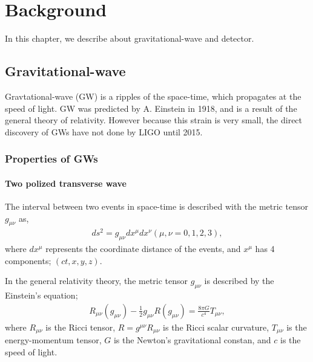 \chapter{Background}
In this chapter, we describe about gravitational-wave and detector.

\section{Gravitational-wave}
Gravtational-wave (GW) is a ripples of the space-time, which propagates at the speed of light. GW was predicted by A. Einstein in 1918, and is a result of the general theory of relativity. However because this strain is very small, the direct discovery of GWs have not done by LIGO until 2015.

\subsection{Properties of GWs}
\subsubsection{Two polized transverse wave}
The interval between two events in space-time is
described with the metric tensor $g_{\mu\nu}$ as, 
\begin{eqnarray}
  d s^{2}=g_{\mu \nu} d x^{\mu} d x^{\nu} (\mu,\nu = 0,1,2,3),
\end{eqnarray}
where $dx^{\mu}$ represents the coordinate distance of the events, and $x^{\mu}$ has 4 components; $(ct,x,y,z)$.

In the general relativity theory\cite{einstein1916vd}, the metric tensor $g_{\mu\nu}$ is described by the Einstein's equation;
\begin{eqnarray}
  R_{\mu \nu}\left(g_{\mu \nu}\right)-\frac{1}{2} g_{\mu \nu} R\left(g_{\mu \nu}\right)=\frac{8 \pi G}{c^{4}} T_{\mu \nu},
\end{eqnarray}
where $R_{\mu\nu}$ is the Ricci tensor, $R=g^{\mu \nu} R_{\mu \nu}$ is the Ricci scalar curvature, $T_{\mu\nu}$ is the energy-momentum tensor, $G$ is the Newton's gravitational constan, and $c$ is the speed of light.

